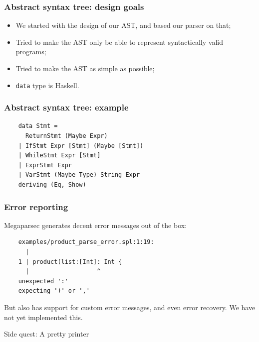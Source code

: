 \documentclass{beamer}
\begin{document}

\begin{frame}
  \frametitle{Abstract syntax tree: design goals}

  \begin{itemize}[<+->]
    \item We started with the design of our AST, and based our parser on that;
    \item Tried to make the AST only be able to represent syntactically valid programs;
    \item Tried to make the AST as simple as possible;
    \item \texttt{data} type is Haskell.
  \end{itemize}
\end{frame}

\begin{frame}[fragile]
  \frametitle{Abstract syntax tree: example}

  \begin{verbatim}
    data Stmt =
      ReturnStmt (Maybe Expr)
    | IfStmt Expr [Stmt] (Maybe [Stmt])
    | WhileStmt Expr [Stmt]
    | ExprStmt Expr
    | VarStmt (Maybe Type) String Expr
    deriving (Eq, Show)
  \end{verbatim}
\end{frame}


\begin{frame}[fragile]
  \frametitle{Error reporting}

  Megaparsec generates decent error messages out of the box:

  \begin{verbatim}
    examples/product_parse_error.spl:1:19:
      |
    1 | product(list:[Int]: Int {
      |                   ^
    unexpected ':'
    expecting ')' or ','
  \end{verbatim}

  But also has support for custom error messages, and even error recovery. We have not yet implemented this.
\end{frame}

\begin{frame}
  \begin{center}Side quest: A pretty printer\end{center}
\end{frame}
\end{document}
